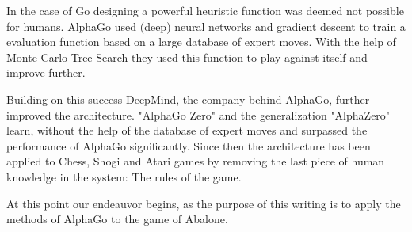 In the case of Go designing a powerful heuristic function was deemed not possible for humans. AlphaGo used (deep) neural networks and gradient descent to train a evaluation function based on a large database of expert moves. With the help of Monte Carlo Tree Search they used this function to play against itself and improve further. \cite{silver_mastering_2017}

Building on this success DeepMind, the company behind AlphaGo, further improved the architecture. "AlphaGo Zero" and the generalization "AlphaZero"  learn, without the help of the database of expert moves and surpassed the performance of AlphaGo significantly. Since then the architecture has been applied to Chess, Shogi and Atari games by removing the last piece of human knowledge in the system: The rules of the game. \cite{schrittwieser_mastering_2020}

At this point our endeauvor begins, as the purpose of this writing is to apply the methods of AlphaGo to the game of Abalone.